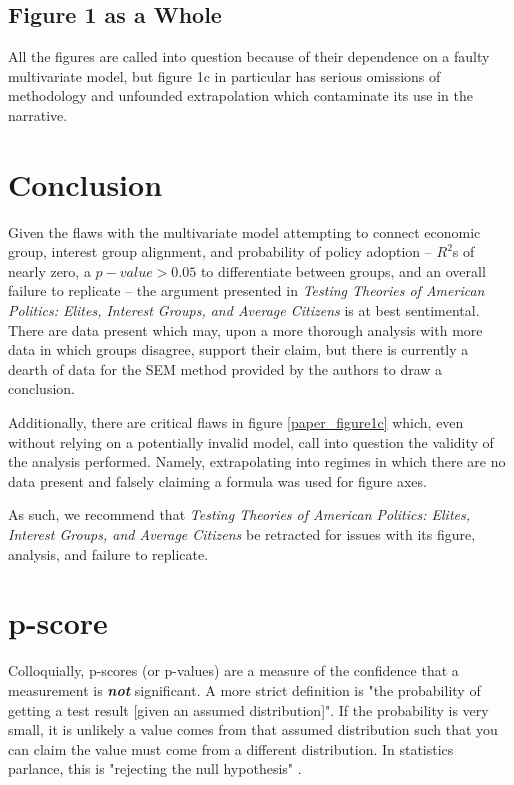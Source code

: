 \documentclass[]{article}
\begin{document}
\subsection{Figure 1 as a Whole}
All the figures are called into question because of their dependence on a faulty multivariate model, but figure 1c in particular has serious omissions of methodology and unfounded extrapolation which contaminate its use in the narrative.


\section{Conclusion}
Given the flaws with the multivariate model attempting to connect economic group, interest group alignment, and probability of policy adoption -- $R^2$s of nearly zero, a $p-value > 0.05$ to differentiate between groups, and an overall failure to replicate -- the argument presented in \textit{Testing Theories of American Politics: Elites, Interest Groups, and Average Citizens} is at best sentimental.
There are data present which may, upon a more thorough analysis with more data in which groups disagree, support their claim, but there is currently a dearth of data for the SEM method provided by the authors to draw a conclusion.

Additionally, there are critical flaws in figure \ref{paper_figure1c} which, even without relying on a potentially invalid model, call into question the validity of the analysis performed. Namely, extrapolating into regimes in which there are no data present and falsely claiming a formula was used for figure axes.

As such, we recommend that \textit{Testing Theories of American Politics: Elites, Interest Groups, and Average Citizens} be retracted for issues with its figure, analysis, and failure to replicate.

\newpage


\newpage
\appendix
\section{p-score}
\label{section_p-score}
Colloquially, p-scores (or p-values) are a measure of the confidence that a measurement is \textbf{\textit{not}} significant. 
A more strict definition is "the probability of getting a test result [given an assumed distribution]". 
If the probability is very small, it is unlikely a value comes from that assumed distribution such that you can claim the value must come from a different distribution.
In statistics parlance, this is "rejecting the null hypothesis" \cite{introstats, statquest_1, statquest_2}.
\end{document}
